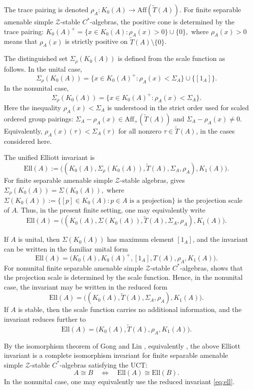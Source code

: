 \documentclass[11pt]{amsart}
\theoremstyle{definition}
\theoremstyle{remark}
\newcommand{\Ell}{\mathrm{Ell}}
\newcommand{\Aff}{\mathrm{Aff}}
\begin{document}
The trace pairing is denoted $\rho_A\colon K_0(A)\to \Aff(\widetilde T(A)).$
For finite separable amenable simple $\mathcal Z$-stable $C^*$-algebras,
the positive cone is determined by the trace pairing: $K_0(A)^+=\{x\in K_0(A):\rho_A(x)>0\}\cup\{0\},$
where $\rho_A(x)>0$ means that $\rho_A(x)$ is strictly positive on
$\widetilde T(A)\setminus\{0\}$.

The distinguished set $\Sigma_\rho(K_0(A))$ is defined from the scale function
as follows. In the unital case,
\[
\Sigma_\rho(K_0(A))
=
\{x\in K_0(A)^+:\rho_A(x)<\Sigma_A\}\cup\{[1_A]\}.
\]
In the nonunital case,
\[
\Sigma_\rho(K_0(A))
=
\{x\in K_0(A)^+:\rho_A(x)<\Sigma_A\}.
\]
Here the inequality $\rho_A(x)<\Sigma_A$ is understood in the strict order used for scaled
ordered group pairings: $\Sigma_A-\rho_A(x)\in
\Aff_+(\widetilde T(A))$ and $\Sigma_A-\rho_A(x)\neq0$.
Equivalently, \(\rho_A(x)(\tau)<\Sigma_A(\tau)\) for all nonzero
\(\tau\in\widetilde T(A)\), in the cases considered here.

The unified Elliott invariant is
\[
\Ell(A)
:=
\bigl((K_0(A),\Sigma_\rho(K_0(A)),\widetilde T(A),\Sigma_A,\rho_A),
K_1(A)\bigr).
\]
For finite separable amenable simple $\mathcal Z$-stable algebras,
\cite[Theorem~5.11]{GongLinNiuReview} gives $\Sigma_\rho(K_0(A))=\Sigma(K_0(A)),$
where $\Sigma(K_0(A)):=\{[p]\in K_0(A):p\in A\text{ is a projection}\}$
is the projection scale of $A$. Thus, in the present finite setting, one may
equivalently write
\[
\Ell(A)
=
\bigl((K_0(A),\Sigma(K_0(A)),\widetilde T(A),\Sigma_A,\rho_A),
K_1(A)\bigr).
\]

If $A$ is unital, then $\Sigma(K_0(A))$ has maximum element $[1_A]$, and
the invariant can be written in the familiar unital form
\[
\Ell(A)
=
\bigl(K_0(A),K_0(A)^+,[1_A],T(A),\rho_A,K_1(A)\bigr).
\]
For nonunital finite separable amenable simple $\mathcal Z$-stable
$C^*$-algebras, \cite[Theorem~5.13]{GongLinNiuReview} shows that the
projection scale is determined by the scale function. Hence, in the nonunital
case, the invariant may be written in the reduced form
\begin{equation}\label{eq:ell}
\Ell(A)
=
\bigl((K_0(A),\widetilde T(A),\Sigma_A,\rho_A),K_1(A)\bigr).
\end{equation}
If \(A\) is stable, then the scale function carries no additional information,
and the invariant reduces further to
\[
\Ell(A)
=
\bigl(K_0(A),\widetilde T(A),\rho_A,K_1(A)\bigr).
\]

By the isomorphism theorem of Gong and Lin
\cite[Theorem~14.9]{GongLinNonunitalIV}, equivalently
\cite[Theorem~5.13]{GongLinNiuReview}, the above Elliott invariant is a
complete isomorphism invariant for finite separable amenable simple
$\mathcal Z$-stable $C^*$-algebras satisfying the UCT:
\[
A\cong B
\quad\Longleftrightarrow\quad
\Ell(A)\cong\Ell(B).
\]
In the nonunital case, one may equivalently use the reduced invariant
\eqref{eq:ell}.
\end{document}
